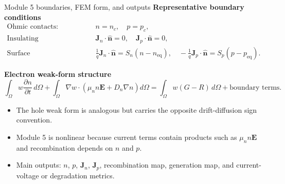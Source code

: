 \documentclass[aspectratio=169,10pt]{beamer}
\begin{document}
\begin{frame}{Module 5 boundaries, FEM form, and outputs}
\footnotesize
\textbf{Representative boundary conditions}
\vspace{-0.25em}
\begin{align*}
\text{Ohmic contacts:}&\qquad n=n_c,\quad p=p_c,\\[-0.15em]
\text{Insulating boundaries:}&\qquad \mathbf J_n\cdot\hat{\mathbf n}=0,\quad \mathbf J_p\cdot\hat{\mathbf n}=0,\\[-0.15em]
\text{Surface recombination:}&\qquad \frac{1}{q}\mathbf J_n\cdot\hat{\mathbf n}=S_n(n-n_{\mathrm{eq}}),\quad
-\frac{1}{q}\mathbf J_p\cdot\hat{\mathbf n}=S_p(p-p_{\mathrm{eq}}).
\end{align*}

\vspace{-0.35em}
\textbf{Electron weak-form structure}
\vspace{-0.25em}
\begin{equation*}
\int_{\Omega}w\frac{\partial n}{\partial t}\,d\Omega
+
\int_{\Omega}\nabla w\cdot\left(\mu_n n\mathbf E+D_n\nabla n\right)d\Omega
=
\int_{\Omega}w(G-R)\,d\Omega+\text{boundary terms}.
\end{equation*}

\vspace{-0.25em}
\begin{itemize}
    \item The hole weak form is analogous but carries the opposite drift-diffusion sign convention.
    \item Module 5 is nonlinear because current terms contain products such as $\mu_n n\mathbf E$ and recombination depends on $n$ and $p$.
    \item Main outputs: $n$, $p$, $\mathbf J_n$, $\mathbf J_p$, recombination map, generation map, and current-voltage or degradation metrics.
\end{itemize}
\end{frame}
\end{document}
